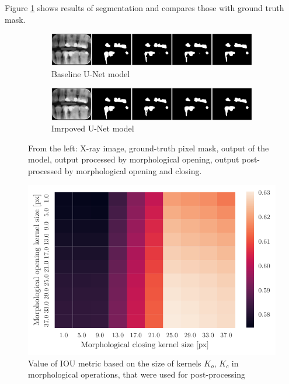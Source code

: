 Figure \ref{fig:segmentation_unet_sample} shows results of segmentation and compares those with ground truth mask.

\begin{figure}[h]
    \centering
    \begin{subfigure}[b]{\textwidth}
        \includegraphics[width=1\linewidth]{images/unet_1_img_12.pdf}
        \caption{Baseline U-Net model}
    \end{subfigure}

    \begin{subfigure}[b]{\textwidth}
        \includegraphics[width=1\linewidth]{images/unet_2_img_12.pdf}
        \caption{Imrpoved U-Net model}
    \end{subfigure}
    \caption{From the left: X-ray image, ground-truth pixel mask, output of the model, output processed by morphological opening, output post-processed by morphological opening and closing.}
    \label{fig:segmentation_unet_sample}
\end{figure}

\begin{figure}[H]
    \centering
    \includegraphics[]{images/heatmap_of_unetpostproc_search.pdf}
    \caption{Value of IOU metric based on the size of kernels $K_o$, $K_c$ in morphological operations, that were used for post-processing}
    \label{fig:heatmap_postprocess}
\end{figure}

